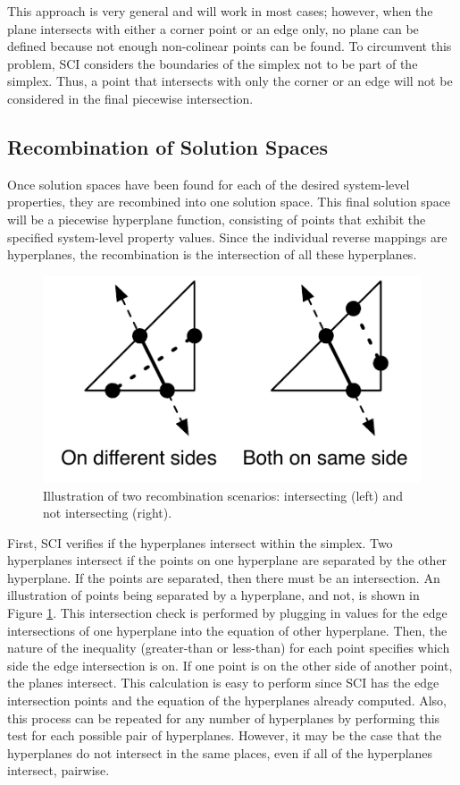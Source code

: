 This approach is very general and will work in most cases; however, when the plane intersects with either a corner point or an edge only, no plane can be defined because not enough non-colinear points can be found.
To circumvent this problem, SCI considers the boundaries of the simplex not to be part of the simplex.
Thus, a point that intersects with only the corner or an edge will not be considered in the final piecewise intersection.

\subsection{Recombination of Solution Spaces}

Once solution spaces have been found for each of the desired system-level properties, they are recombined into one solution space.
This final solution space will be a piecewise hyperplane function, consisting of points that exhibit the specified system-level property values.
Since the individual reverse mappings are hyperplanes, the recombination is the intersection of all these hyperplanes.


\begin{figure}[ht]
\centering
\includegraphics[scale=1]{images/intcheck.pdf}
\caption{Illustration of two recombination scenarios: intersecting (left) and not intersecting (right).}
\label{fig:intcheck}
\end{figure}


First, SCI verifies if the hyperplanes intersect within the simplex.
Two hyperplanes intersect if the points on one hyperplane are separated by the other hyperplane.
If the points are separated, then there must be an intersection.
An illustration of points being separated by a hyperplane, and not, is shown in Figure \ref{fig:intcheck}.
This intersection check is performed by plugging in values for the edge intersections of one hyperplane into the equation of other hyperplane.
Then, the nature of the inequality (greater-than or less-than) for each point specifies which side the edge intersection is on.
If one point is on the other side of another point, the planes intersect.
This calculation is easy to perform since SCI has the edge intersection points and the equation of the hyperplanes already computed.
Also, this process can be repeated for any number of hyperplanes by performing this test for each possible pair of hyperplanes.
However, it may be the case that the hyperplanes do not intersect in the same places, even if all of the  hyperplanes intersect, pairwise.



